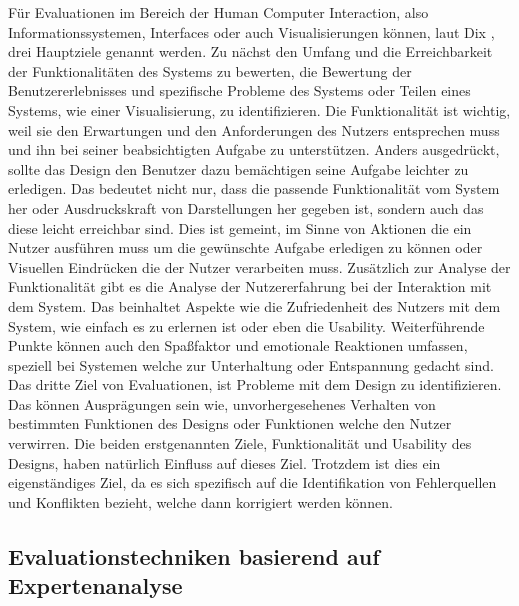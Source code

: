 \documentclass[draft=false
              ,paper=a4
              ,twoside=false
              ,fontsize=11pt
              ,headsepline
              ,BCOR10mm
              ,DIV11
              ]{scrbook}
\begin{document}
Für Evaluationen im Bereich der Human Computer Interaction, also Informationssystemen, Interfaces oder auch Visualisierungen können, laut Dix \cite{alan_dix_human-computer_2004}, drei Hauptziele genannt werden. Zu nächst den Umfang und die Erreichbarkeit der Funktionalitäten des Systems zu bewerten, die Bewertung der Benutzererlebnisses und spezifische Probleme des Systems oder Teilen eines Systems, wie einer Visualisierung, zu identifizieren. Die Funktionalität ist wichtig, weil sie den Erwartungen und den Anforderungen des Nutzers entsprechen muss und ihn bei seiner beabsichtigten Aufgabe zu unterstützen. Anders ausgedrückt, sollte das Design den Benutzer dazu bemächtigen seine Aufgabe leichter zu erledigen. Das bedeutet nicht nur, dass die passende Funktionalität vom System her oder Ausdruckskraft von Darstellungen her gegeben ist, sondern auch das diese leicht erreichbar sind. Dies ist gemeint, im Sinne von Aktionen die ein Nutzer ausführen muss um die gewünschte Aufgabe erledigen zu können oder Visuellen Eindrücken die der Nutzer verarbeiten muss.
Zusätzlich zur Analyse der Funktionalität gibt es die Analyse der  Nutzererfahrung bei der Interaktion mit dem System. Das beinhaltet Aspekte wie die Zufriedenheit des Nutzers mit dem System, wie einfach es zu erlernen ist oder eben die Usability. Weiterführende Punkte können auch den Spaßfaktor und emotionale Reaktionen umfassen, speziell bei Systemen welche zur Unterhaltung oder Entspannung gedacht sind. 
Das dritte Ziel von Evaluationen, ist Probleme mit dem Design zu identifizieren. Das können Ausprägungen sein wie, unvorhergesehenes Verhalten von bestimmten Funktionen des Designs oder Funktionen welche den Nutzer verwirren. Die beiden erstgenannten Ziele, Funktionalität und Usability des Designs, haben natürlich Einfluss auf dieses Ziel. Trotzdem ist dies ein eigenständiges Ziel, da es sich spezifisch auf die Identifikation von Fehlerquellen und Konflikten bezieht, welche dann korrigiert werden können.

\subsection{Evaluationstechniken basierend auf Expertenanalyse} %
\label{sub:evaluationstechniken_basierend_auf_expertenanalyse}
\end{document}
